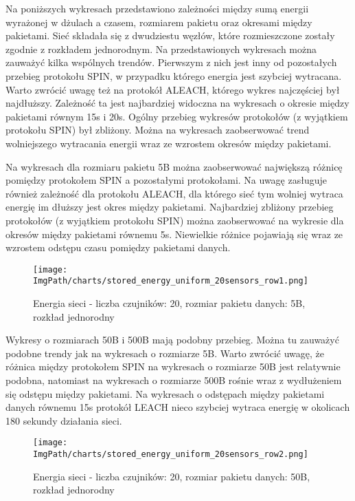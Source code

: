 Na poniższych wykresach przedstawiono zależności między sumą energii wyrażonej w dżulach a czasem, rozmiarem pakietu oraz okresami między pakietami. Sieć składała się z dwudziestu węzłów, które rozmieszczone zostały zgodnie z rozkładem jednorodnym.
Na przedstawionych wykresach można zauważyć kilka wspólnych trendów. Pierwszym z nich jest inny od pozostałych przebieg protokołu SPIN, w przypadku którego energia jest szybciej wytracana. Warto zwrócić uwagę też na protokół ALEACH, którego wykres najczęściej był najdłuższy. Zależność ta jest najbardziej widoczna na wykresach o okresie między pakietami równym 15s i 20s. Ogólny przebieg wykresów protokołów (z wyjątkiem protokołu SPIN) był zbliżony. Można na wykresach zaobserwować trend wolniejszego wytracania energii wraz ze wzrostem okresów między pakietami.

Na wykresach dla rozmiaru pakietu 5B można zaobserwować największą różnicę pomiędzy protokołem SPIN a pozostałymi protokołami. Na uwagę zasługuje również zależność dla protokołu ALEACH, dla którego sieć tym wolniej wytraca energię im dłuższy jest okres między pakietami. Najbardziej zbliżony przebieg protokołów (z wyjątkiem protokołu SPIN) można zaobserwować na wykresie dla okresów między pakietami równemu 5s. Niewielkie różnice pojawiają się wraz ze wzrostem odstępu czasu pomiędzy pakietami danych.

\begin{figure}[H]
	\begin{center}
		\texttt{[image: \\ImgPath/charts/stored\_energy\_uniform\_20sensors\_row1.png]}
	\end{center}
	\caption{Energia sieci - liczba czujników: 20, rozmiar pakietu danych: 5B, rozkład jednorodny}
\end{figure}
 
Wykresy o rozmiarach 50B i 500B mają podobny przebieg. Można tu zauważyć podobne trendy jak na wykresach o rozmiarze 5B. Warto zwrócić uwagę, że różnica między protokołem SPIN na wykresach o rozmiarze 50B jest relatywnie podobna, natomiast na wykresach o rozmiarze 500B rośnie wraz z wydłużeniem się odstępu między pakietami. Na wykresach o odstępach między pakietami danych równemu 15s protokół LEACH nieco szybciej wytraca energię w okolicach 180 sekundy działania sieci.

\begin{figure}[H]
	\begin{center}
		\texttt{[image: \\ImgPath/charts/stored\_energy\_uniform\_20sensors\_row2.png]}
	\end{center}
	\caption{Energia sieci - liczba czujników: 20, rozmiar pakietu danych: 50B, rozkład jednorodny}
\end{figure}


